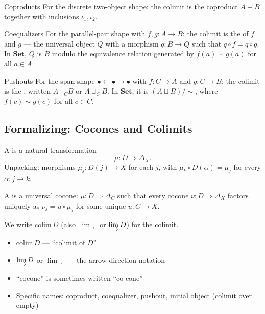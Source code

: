 \begin{example}{Coproducts}
For the discrete two-object shape: the colimit is the coproduct $A + B$
together with inclusions $\iota_1, \iota_2$.
\end{example}

\begin{example}{Coequalizers}
For the parallel-pair shape with $f, g : A \to B$: the colimit is the
 of $f$ and $g$ --- the universal object $Q$ with a
morphism $q : B \to Q$ such that $q \circ f = q \circ g$. In $\mathbf{Set}$,
$Q$ is $B$ modulo the equivalence relation generated by $f(a) \sim g(a)$
for all $a \in A$.
\end{example}

\begin{example}{Pushouts}
For the span shape $\bullet \leftarrow \bullet \to \bullet$ with
$f : C \to A$ and $g : C \to B$: the colimit is the ,
written $A +_C B$ or $A \sqcup_C B$. In $\mathbf{Set}$, it is
$(A \sqcup B) / \sim$, where $f(c) \sim g(c)$ for all $c \in C$.
\end{example}

\subsection{Formalizing: Cocones and Colimits}

A  is a natural transformation
\begin{equation*}
  \mu : D \Rightarrow \Delta_X.
\end{equation*}
Unpacking: morphisms $\mu_j : D(j) \to X$ for each $j$, with
$\mu_k \circ D(\alpha) = \mu_j$ for every $\alpha : j \to k$.

A  is a universal cocone: $\mu : D \Rightarrow
\Delta_C$ such that every cocone $\nu : D \Rightarrow \Delta_X$ factors
uniquely as $\nu_j = u \circ \mu_j$ for some unique $u : C \to X$.

We write $\mathrm{colim}\, D$ (also $\lim_\to$ or $\varinjlim D$) for the
colimit.

\begin{howtosay}
\begin{itemize}
  \item $\mathrm{colim}\, D$ --- ``colimit of $D$''
  \item $\varinjlim D$ or $\lim_\to$ --- the arrow-direction notation
  \item ``cocone'' is sometimes written ``co-cone''
  \item Specific names: coproduct, coequalizer, pushout, initial object
        (colimit over empty)
\end{itemize}
\end{howtosay}

